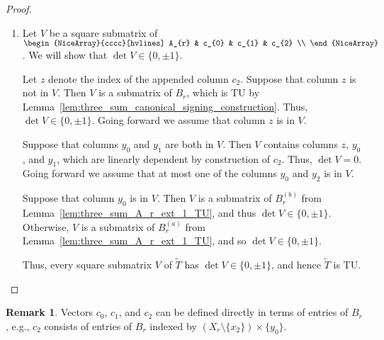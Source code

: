 \documentclass{article}
\theoremstyle{definition}
\newtheorem{remark}[theorem]{Remark}
\begin{document}
\begin{proof}
\begin{enumerate}
        \item Let $V$ be a square submatrix of $\begin{NiceArray}{cccc}[hvlines] A_{r} & c_{0} & c_{1} & c_{2} \\ \end{NiceArray}$. We will show that $\det V \in \{0, \pm 1\}$.

        Let $z$ denote the index of the appended column $c_{2}$. Suppose that column $z$ is not in $V$. Then $V$ is a submatrix of $B_{r}$, which is TU by Lemma~\ref{lem:three_sum_canonical_signing_construction}. Thus, $\det V \in \{0, \pm 1\}$. Going forward we assume that column $z$ is in $V$.

        Suppose that columns $y_{0}$ and $y_{1}$ are both in $V$. Then $V$ contains columns $z$, $y_{0}$, and $y_{1}$, which are linearly dependent by construction of $c_{2}$. Thus, $\det V = 0$. Going forward we assume that at most one of the columns $y_{0}$ and $y_{2}$ is in $V$.

        Suppose that column $y_{0}$ is in $V$. Then $V$ is a submatrix of $B_{r}^{(b)}$ from Lemma~\ref{lem:three_sum_A_r_ext_1_TU}, and thus $\det V \in \{0, \pm 1\}$. Otherwise, $V$ is a submatrix of $B_{r}^{(a)}$ from Lemma~\ref{lem:three_sum_A_r_ext_1_TU}, and so $\det V \in \{0, \pm 1\}$.

        Thus, every square submatrix $V$ of $\tilde{T}$ has $\det V \in \{0, \pm 1\}$, and hence $\tilde{T}$ is TU.
    \end{enumerate}
\end{proof}

\begin{remark}
    Vectors $c_{0}$, $c_{1}$, and $c_{2}$ can be defined directly in terms of entries of $B_{r}$, e.g., $c_{2}$ consists of entries of $B_{r}$ indexed by $(X_{r} \setminus \{x_{2}\}) \times \{y_{0}\}$.
\end{remark}
\end{document}
